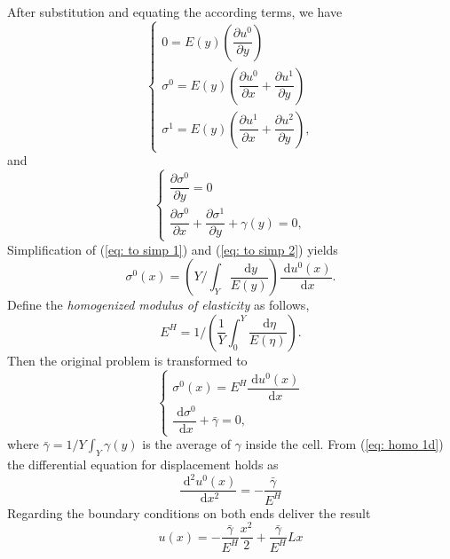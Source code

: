 \documentclass[10pt,a4paper]{scrreprt}
\newcommand{\myd}{\;\mathrm{d}}
\begin{document}
After substitution and equating the according terms, we have
\begin{equation}
\label{eq: to simp 1}
\left\{
\begin{array}{l}
0 = E(y)\left( \dfrac{\partial u^{0}}{\partial y} \right) \\
\sigma^{0} = E(y) \left( \dfrac{\partial u^{0}}{\partial x} + \dfrac{\partial u^{1}}{\partial y} \right) \\
\sigma^{1} = E(y) \left( \dfrac{\partial u^{1}}{\partial x} + \dfrac{\partial u^{2}}{\partial y} \right),
\end{array}
\right.
\end{equation}
and
\begin{equation}
\label{eq: to simp 2}
\left\{
\begin{array}{l}
\dfrac{\partial \sigma^{0}}{\partial y}=0 \\
\dfrac{\partial \sigma^{0}}{\partial x} + \dfrac{\partial \sigma^{1}}{\partial y} + \gamma(y) = 0, 
\end{array}
\right.
\end{equation}
Simplification of (\ref{eq: to simp 1}) and (\ref{eq: to simp 2}) yields
\begin{equation}
\label{eq: sigma 0}
\sigma^{0}(x) = \left(Y/\int_{Y} \dfrac{\myd{y}}{E(y)} \right) \dfrac{\myd{u^{0}(x)}}{\myd{x}}.
\end{equation}
Define the \textit{homogenized modulus of elasticity} as follows,
\begin{equation}
E^{H} = 1/ \left( \dfrac{1}{Y} \int_{0}^{Y} \dfrac{\myd{\eta}}{E(\eta)}\right) .
\end{equation}
Then the original problem is transformed to
\begin{equation}
\label{eq: homo 1d}
\left\{
\begin{array}{l}
\sigma^{0}(x) = E^{H} \dfrac{\myd{u^{0}(x)}}{\myd{x}} \\
\dfrac{\myd{\sigma^{0}}}{\myd{x}} + \bar{\gamma} = 0,
\end{array}
\right.
\end{equation}
where $\bar{\gamma}=1/Y \int_{Y} \gamma(y)$ is the average of $\gamma$ inside the cell. From (\ref{eq: homo 1d}) the differential equation for displacement holds as
\begin{equation}
\dfrac{\myd^2 u^{0}(x)}{\myd{x^{2}}} = -\dfrac{\bar{\gamma}}{E^{H}}
\end{equation}
Regarding the boundary conditions on both ends deliver the result
\[u(x) = -\dfrac{\bar{\gamma}}{E^{H}} \dfrac{x^{2}}{2} + \dfrac{\bar{\gamma}}{E^{H}} Lx \]
\end{document}
